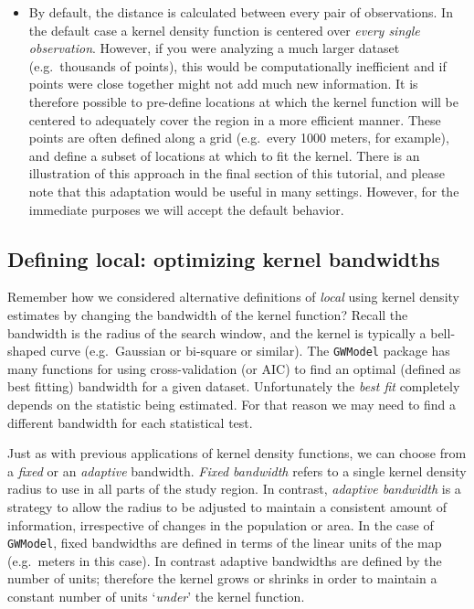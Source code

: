 \documentclass[
]{book}
\newcommand{\passthrough}[1]{#1}
\newenvironment{rmdblock}[1]
  {%
  \begin{itemize}
  \renewcommand{\labelitemi}{
    \raisebox{-.7\height}[0pt][0pt]{
      {\setkeys{Gin}{width=3em,keepaspectratio}\texttt{[image: images/\#1]}}
    }
  }
  \item
  }
  {
  \end{itemize}
  }
\newenvironment{rmdnote}
  {\begin{rmdblock}{note}}
  {\end{rmdblock}}
\begin{document}
\begin{rmdnote}
By default, the distance is calculated between every pair of observations. In the default case a kernel density function is centered over \emph{every single observation}. However, if you were analyzing a much larger dataset (e.g.~thousands of points), this would be computationally inefficient and if points were close together might not add much new information. It is therefore possible to pre-define locations at which the kernel function will be centered to adequately cover the region in a more efficient manner. These points are often defined along a grid (e.g.~every 1000 meters, for example), and define a subset of locations at which to fit the kernel. There is an illustration of this approach in the final section of this tutorial, and please note that this adaptation would be useful in many settings. However, for the immediate purposes we will accept the default behavior.
\end{rmdnote}

\hypertarget{defining-local-optimizing-kernel-bandwidths}{%
\subsection{Defining local: optimizing kernel bandwidths}\label{defining-local-optimizing-kernel-bandwidths}}

Remember how we considered alternative definitions of \emph{local} using kernel density estimates by changing the bandwidth of the kernel function? Recall the bandwidth is the radius of the search window, and the kernel is typically a bell-shaped curve (e.g.~Gaussian or bi-square or similar). The \passthrough{\lstinline!GWModel!} package has many functions for using cross-validation (or AIC) to find an optimal (defined as best fitting) bandwidth for a given dataset. Unfortunately the \emph{best fit} completely depends on the statistic being estimated. For that reason we may need to find a different bandwidth for each statistical test.

Just as with previous applications of kernel density functions, we can choose from a \emph{fixed} or an \emph{adaptive} bandwidth. \emph{Fixed bandwidth} refers to a single kernel density radius to use in all parts of the study region. In contrast, \emph{adaptive bandwidth} is a strategy to allow the radius to be adjusted to maintain a consistent amount of information, irrespective of changes in the population or area. In the case of \passthrough{\lstinline!GWModel!}, fixed bandwidths are defined in terms of the linear units of the map (e.g.~meters in this case). In contrast adaptive bandwidths are defined by the number of units; therefore the kernel grows or shrinks in order to maintain a constant number of units `\emph{under}' the kernel function.
\end{document}
